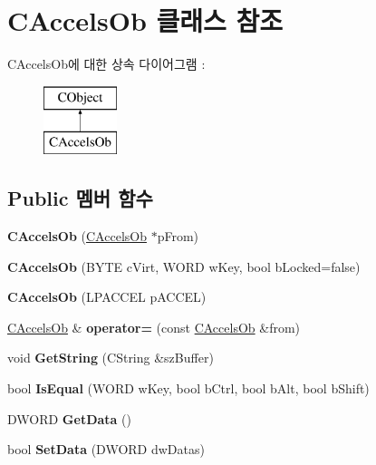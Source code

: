 \hypertarget{class_c_accels_ob}{}\section{C\+Accels\+Ob 클래스 참조}
\label{class_c_accels_ob}
C\+Accels\+Ob에 대한 상속 다이어그램 \+: \begin{figure}[H]
\begin{center}
\leavevmode
\includegraphics[height=2.000000cm]{class_c_accels_ob}
\end{center}
\end{figure}
\subsection*{Public 멤버 함수}
\begin{DoxyCompactItemize}
\item 
\mbox{\label{class_c_accels_ob_afca345908aafde57de46430bbf2018d9}} 
{\bfseries C\+Accels\+Ob} (\mbox{\hyperlink{class_c_accels_ob}{C\+Accels\+Ob}} $\ast$p\+From)
\item 
\mbox{\label{class_c_accels_ob_acba35eec2e75114289468292870bf484}} 
{\bfseries C\+Accels\+Ob} (B\+Y\+TE c\+Virt, W\+O\+RD w\+Key, bool b\+Locked=false)
\item 
\mbox{\label{class_c_accels_ob_aa28d7238be643bb20d922cb360881bd6}} 
{\bfseries C\+Accels\+Ob} (L\+P\+A\+C\+C\+EL p\+A\+C\+C\+EL)
\item 
\mbox{\label{class_c_accels_ob_ae6075be9ad7656823f5cecd277dd7d6e}} 
\mbox{\hyperlink{class_c_accels_ob}{C\+Accels\+Ob}} \& {\bfseries operator=} (const \mbox{\hyperlink{class_c_accels_ob}{C\+Accels\+Ob}} \&from)
\item 
\mbox{\label{class_c_accels_ob_afaf7510fa1e0707863f6bd469f190de6}} 
void {\bfseries Get\+String} (C\+String \&sz\+Buffer)
\item 
\mbox{\label{class_c_accels_ob_a32714a4454d398d3d3a68d1705a76bc5}} 
bool {\bfseries Is\+Equal} (W\+O\+RD w\+Key, bool b\+Ctrl, bool b\+Alt, bool b\+Shift)
\item 
\mbox{\label{class_c_accels_ob_abbbdc5e93061f67ade785c9e4f07b918}} 
D\+W\+O\+RD {\bfseries Get\+Data} ()
\item 
\mbox{\label{class_c_accels_ob_a47a1e7e047807b7a36553aa351768096}} 
bool {\bfseries Set\+Data} (D\+W\+O\+RD dw\+Datas)
\end{DoxyCompactItemize}
